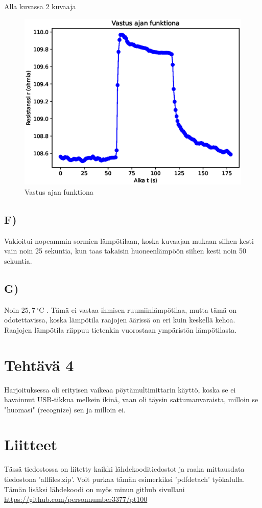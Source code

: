 \documentclass{article}
\begin{document}
Alla kuvassa 2 kuvaaja

\begin{figure}[h!]
    \centering
    \includegraphics[width=1.0\linewidth]{resistance_plot.eps}
    \caption{Vastus ajan funktiona}
    \label{fig:resistance_plot_figure}
\end{figure}
\newpage
\subsection*{F)}
Vakioitui nopeammin sormien lämpötilaan, koska kuvaajan mukaan siihen kesti vain noin 25 sekuntia, kun taas takaisin huoneenlämpöön siihen kesti noin 50 sekuntia.
\subsection*{G)}
Noin $25,7\,^\circ\text{C}$ . Tämä ei vastaa ihmisen ruumiinlämpötilaa, mutta tämä on odotettavissa, koska lämpötila raajojen äärissä on eri kuin keskellä kehoa. Raajojen lämpötila riippuu tietenkin vuorostaan ympäristön lämpötilasta.

\section*{Tehtävä 4}

Harjoituksessa oli erityisen vaikeaa pöytämultimittarin käyttö, 
koska se ei havainnut USB-tikkua melkein ikinä, vaan oli täysin sattumanvaraista, 
milloin se "huomasi" (recognize) sen ja milloin ei.




\section*{Liitteet}
Tässä tiedostossa on liitetty kaikki lähdekooditiedostot ja raaka mittausdata tiedostona 'allfiles.zip'. Voit purkaa tämän esimerkiksi 'pdfdetach' työkalulla. Tämän lisäksi lähdekoodi on myös minun github sivullani \url{https://github.com/personnumber3377/pt100} 
\end{document}

